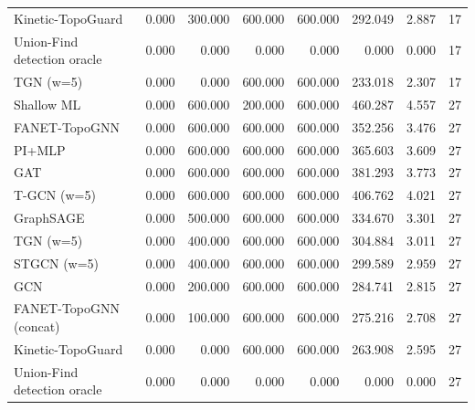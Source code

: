 \begin{tabular}{lrrrrrrr}
Kinetic-TopoGuard & 0.000 & 300.000 & 600.000 & 600.000 & 292.049 & 2.887 & 17 \\
Union-Find detection oracle & 0.000 & 0.000 & 0.000 & 0.000 & 0.000 & 0.000 & 17 \\
TGN (w=5) & 0.000 & 0.000 & 600.000 & 600.000 & 233.018 & 2.307 & 17 \\
Shallow ML & 0.000 & 600.000 & 200.000 & 600.000 & 460.287 & 4.557 & 27 \\
FANET-TopoGNN & 0.000 & 600.000 & 600.000 & 600.000 & 352.256 & 3.476 & 27 \\
PI+MLP & 0.000 & 600.000 & 600.000 & 600.000 & 365.603 & 3.609 & 27 \\
GAT & 0.000 & 600.000 & 600.000 & 600.000 & 381.293 & 3.773 & 27 \\
T-GCN (w=5) & 0.000 & 600.000 & 600.000 & 600.000 & 406.762 & 4.021 & 27 \\
GraphSAGE & 0.000 & 500.000 & 600.000 & 600.000 & 334.670 & 3.301 & 27 \\
TGN (w=5) & 0.000 & 400.000 & 600.000 & 600.000 & 304.884 & 3.011 & 27 \\
STGCN (w=5) & 0.000 & 400.000 & 600.000 & 600.000 & 299.589 & 2.959 & 27 \\
GCN & 0.000 & 200.000 & 600.000 & 600.000 & 284.741 & 2.815 & 27 \\
FANET-TopoGNN (concat) & 0.000 & 100.000 & 600.000 & 600.000 & 275.216 & 2.708 & 27 \\
Kinetic-TopoGuard & 0.000 & 0.000 & 600.000 & 600.000 & 263.908 & 2.595 & 27 \\
Union-Find detection oracle & 0.000 & 0.000 & 0.000 & 0.000 & 0.000 & 0.000 & 27 \\
\bottomrule
\end{tabular}